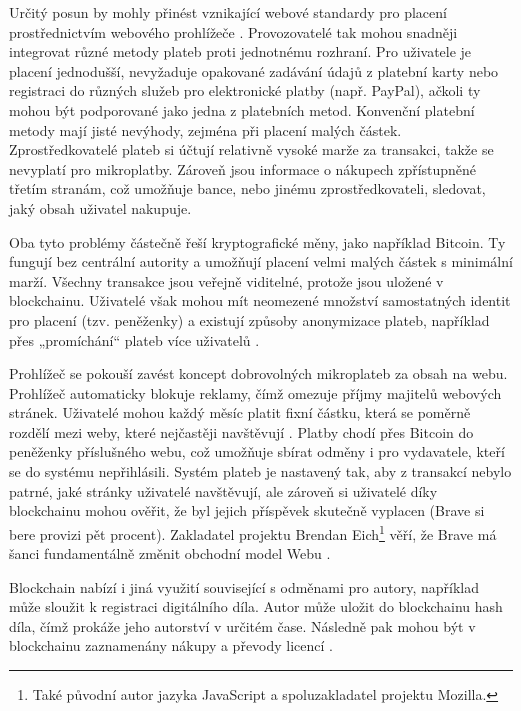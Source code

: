 Určitý posun by mohly přinést vznikající webové standardy pro placení prostřednictvím webového prohlížeče \autocite{W3C:PaymentReq}. Provozovatelé tak mohou snadněji integrovat různé metody plateb proti jednotnému rozhraní. Pro uživatele je placení jednodušší, nevyžaduje opakované zadávání údajů z platební karty nebo registraci do různých služeb pro elektronické platby (např. PayPal), ačkoli ty mohou být podporované jako jedna z platebních metod. Konvenční platební metody mají jisté nevýhody, zejména při placení malých částek. 
Zprostředkovatelé plateb si účtují relativně vysoké marže za transakci, takže se nevyplatí pro mikroplatby. Zároveň jsou informace o nákupech zpřístupněné třetím stranám, což umožňuje bance, nebo jinému zprostředkovateli, sledovat, jaký obsah uživatel nakupuje.


Oba tyto problémy částečně řeší kryptografické měny, jako například Bitcoin. Ty fungují bez centrální autority a umožňují placení velmi malých částek s minimální marží. Všechny transakce jsou veřejně viditelné, protože jsou uložené v blockchainu. Uživatelé však mohou mít neomezené množství samostatných identit pro placení (tzv. peněženky) a existují způsoby anonymizace plateb, například přes „promíchání“ plateb více uživatelů \autocite{Herrera-Joancomarti2015}.

Prohlížeč  se pokouší zavést koncept dobrovolných mikroplateb za obsah na webu. Prohlížeč automaticky blokuje reklamy, čímž omezuje příjmy majitelů webových stránek. Uživatelé mohou každý měsíc platit fixní částku, která se poměrně rozdělí mezi weby, které nejčastěji navštěvují \autocite{BravePay}. Platby chodí přes Bitcoin do peněženky příslušného webu, což umožňuje sbírat odměny i pro vydavatele, kteří se do systému nepřihlásili. Systém plateb je nastavený tak, aby z transakcí nebylo patrné, jaké stránky uživatelé navštěvují, ale zároveň si uživatelé díky blockchainu mohou ověřit, že byl jejich příspěvek skutečně vyplacen (Brave si bere provizi pět procent). Zakladatel projektu Brendan Eich\footnote{Také původní autor jazyka JavaScript a spoluzakladatel projektu Mozilla.} věří, že Brave má šanci fundamentálně změnit obchodní model Webu \autocite{IEEE:Brave}.

\label{p:xw:microt:blockch}
Blockchain nabízí i jiná využití související s odměnami pro autory, například může sloužit k registraci digitálního díla. Autor může uložit do blockchainu hash díla, čímž prokáže jeho autorství v určitém čase. Následně pak mohou být v blockchainu zaznamenány nákupy a převody licencí \autocite{COALA}.

